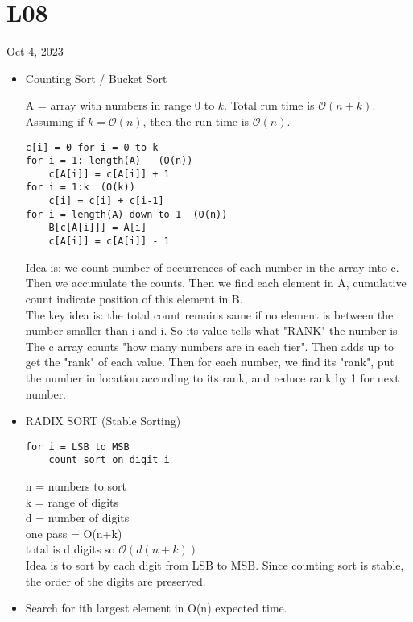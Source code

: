 \section{L08}
Oct 4, 2023
\begin{itemize}
	\item Counting Sort / Bucket Sort
		\begin{theorem}
			A = array with numbers in range 0 to $k$. Total run time is $\mathcal O(n+k)$. Assuming if $k = \mathcal O(n)$, then the run time is $\mathcal O(n)$.
			 \begin{lstlisting}
c[i] = 0 for i = 0 to k
for i = 1: length(A)   (O(n))
    c[A[i]] = c[A[i]] + 1
for i = 1:k  (O(k))
    c[i] = c[i] + c[i-1]
for i = length(A) down to 1  (O(n))
    B[c[A[i]]] = A[i]
	c[A[i]] = c[A[i]] - 1

			\end{lstlisting}
			Idea is: we count number of occurrences of each number in the array into c. Then we accumulate the counts. Then we find each element in A, cumulative count indicate position of this element in B.\\
			The key idea is: the total count remains same if no element is between the number smaller than i and i. So its value tells what "RANK" the number is.\\
			The c array counts "how many numbers are in each tier". Then adds up to get the "rank" of each value. Then for each number, we find its "rank", put the number in location according to its rank, and reduce rank by 1 for next number.
		\end{theorem}
	\item RADIX SORT (Stable Sorting)
		\begin{theorem}
			\begin{lstlisting}
for i = LSB to MSB
	count sort on digit i
				\end{lstlisting}
				n = numbers to sort\\
				k = range of digits\\
				d = number of digits\\
				one pass = O(n+k)\\
				total is d digits so $\mathcal O(d(n+k))$\\
				Idea is to sort by each digit from LSB to MSB. Since counting sort is stable, the order of the digits are preserved.\\
				\end{theorem}
			\item Search for ith largest element in O(n) expected time.
				\begin{theorem}

\end{theorem}
\end{itemize}
